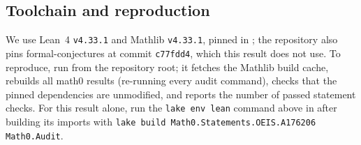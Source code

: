 \documentclass[11pt]{amsart}
\theoremstyle{plain}
\theoremstyle{definition}
\begin{document}
\subsection*{Toolchain and reproduction}
We use Lean~4 \cite{Lean4} \texttt{v4.33.1} and Mathlib \cite{Mathlib} \texttt{v4.33.1}, pinned in ; the repository also pins formal-conjectures \cite{FC} at commit \texttt{c77fdd4}, which this result does not use.
To reproduce, run  from the repository root; it fetches the Mathlib build cache, rebuilds all math0 results (re-running every audit command), checks that the pinned dependencies are unmodified, and reports the number of passed statement checks.
For this result alone, run the \texttt{lake env lean} command above in  after building its imports with \texttt{lake build Math0.Statements.OEIS.A176206 Math0.Audit}.
\end{document}
